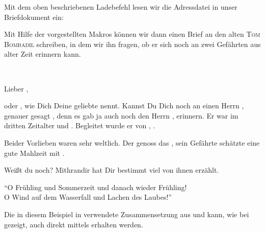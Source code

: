 Mit dem oben beschriebenen Ladebefehl lesen wir die Adressdatei in unser
Briefdokument ein:
\begin{lstcode}
\end{lstcode}

\BeginIndexGroup
{}%
%
%
%
%
%
%
%
%
Mit Hilfe der vorgestellten Makros können wir dann einen Brief
an den alten \textsc{Tom Bombadil} schreiben, in dem wir ihn
fragen, ob er sich noch an zwei Gefährten aus alter Zeit
erinnern kann.
\begin{lstcode}
  \begin{letter}{\\}

    \opening{Lieber  ,}
     
    oder , wie Dich Deine geliebte 
    nennt. Kannst Du Dich noch an einen Herrn 
    , genauer gesagt , denn es gab
    ja auch noch den Herrn , erinnern. Er war 
     im dritten Zeitalter und .
    Begleitet wurde er von , .
      
    Beider Vorlieben waren sehr weltlich. Der 
     genoss das , sein Gefährte
    schätzte eine gute Mahlzeit mit .
      
    Weißt du noch? Mithrandir hat Dir bestimmt viel von ihnen 
    erzählt.

    \closing{"`O Frühling und Sommerzeit
                 und danach wieder Frühling!\\
               O Wind auf dem Wasserfall
                 und Lachen des Laubes!"'}
  \end{letter}
\end{lstcode}
Die in diesem Beispiel in  verwendete
Zusammensetzung aus  und
 kann, wie bei
 gezeigt, auch direkt mittels
 erhalten werden.


